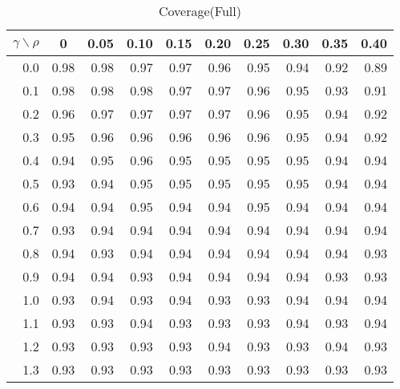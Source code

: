 \documentclass[12pt]{article}
\begin{document}
%
\begin{table}[!tbp]
\caption{Coverage(Full)}
 \begin{center}
 \begin{tabular}{r|rrrrrrrrr}\hline\hline
\multicolumn{1}{c|}{$\gamma\backslash\rho$}&\multicolumn{1}{c}{0}&\multicolumn{1}{c}{0.05}&\multicolumn{1}{c}{0.10}&\multicolumn{1}{c}{0.15}&\multicolumn{1}{c}{0.20}&\multicolumn{1}{c}{0.25}&\multicolumn{1}{c}{0.30}&\multicolumn{1}{c}{0.35}&\multicolumn{1}{c}{0.40}\tabularnewline
\hline
0.0&0.98&0.98&0.97&0.97&0.96&0.95&0.94&0.92&0.89\tabularnewline
0.1&0.98&0.98&0.98&0.97&0.97&0.96&0.95&0.93&0.91\tabularnewline
0.2&0.96&0.97&0.97&0.97&0.97&0.96&0.95&0.94&0.92\tabularnewline
0.3&0.95&0.96&0.96&0.96&0.96&0.96&0.95&0.94&0.92\tabularnewline
0.4&0.94&0.95&0.96&0.95&0.95&0.95&0.95&0.94&0.94\tabularnewline
0.5&0.93&0.94&0.95&0.95&0.95&0.95&0.95&0.94&0.94\tabularnewline
0.6&0.94&0.94&0.95&0.94&0.94&0.95&0.94&0.94&0.94\tabularnewline
0.7&0.93&0.94&0.94&0.94&0.94&0.94&0.94&0.94&0.94\tabularnewline
0.8&0.94&0.93&0.94&0.94&0.94&0.94&0.94&0.94&0.93\tabularnewline
0.9&0.94&0.94&0.93&0.94&0.94&0.94&0.94&0.93&0.93\tabularnewline
1.0&0.93&0.94&0.93&0.94&0.93&0.93&0.94&0.94&0.94\tabularnewline
1.1&0.93&0.93&0.94&0.93&0.93&0.93&0.94&0.93&0.94\tabularnewline
1.2&0.93&0.93&0.93&0.93&0.94&0.93&0.93&0.94&0.93\tabularnewline
1.3&0.93&0.93&0.93&0.93&0.93&0.93&0.93&0.93&0.93\tabularnewline
\hline
\end{tabular}

\end{center}

\end{table}
\end{document}
